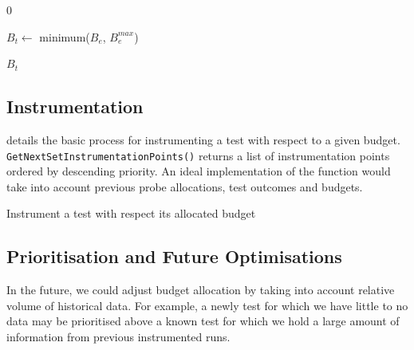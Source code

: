 {\begin{algorithm}[H]
\begin{algorithmic}[1]
	\EndFunction
	\Statex


		\Return $0$
	\EndIf

	\State $B_t \gets$ minimum($B_e$, $B_{e}^{max}$)

	\State \Return $B_t$

	\EndFunction
\end{algorithmic}

\end{algorithm}


\subsection{Instrumentation}

 details the basic process for instrumenting a test
with respect to a given budget. {\tt GetNextSetInstrumentationPoints()} returns
a list of instrumentation points ordered by descending priority. An ideal
implementation of the function would take into account previous probe
allocations, test outcomes and budgets.

\begin{algorithm}[H]
\caption{Instrument a test with respect its allocated budget}
\label{alg:instrument_test}

\begin{algorithmic}

			\Else
			\EndIf
		\EndFor
	\EndWhile

	\EndFunction
\end{algorithmic}

\end{algorithm}


\subsection{Prioritisation and Future Optimisations}

In the future, we could adjust \flaky budget allocation by taking into account
relative volume of historical data. For example, a newly \flaky test for which
we have little to no data may be prioritised above a known \flaky test for which
we hold a large amount of information from previous instrumented runs.

}
